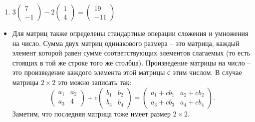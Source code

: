 \documentclass[11pt, a4paper]{extarticle}
\begin{document}
\begin{multicols}{2}
\begin{enumerate}[label=\alph*)]
		\item $3\begin{pmatrix}
		7 \\ -1
		\end{pmatrix} - 2 \begin{pmatrix}
		1 \\ 4
		\end{pmatrix} = \begin{pmatrix}
		19 \\ -11
		\end{pmatrix}$
	\end{enumerate}
\end{multicols}

\begin{itemize}
	\item Для матриц также определены стандартные операции сложения и умножения на число. Сумма двух матриц одинакового размера – это матрица, каждый элемент которой равен сумме соответствующих элементов слагаемых (то есть стоящих в той же строке того же столбца). Произведение матрицы на число – это произведение каждого элемента этой матрицы с этим числом. В случае матрицы $2\times 2$ это можно записать так:
	\[
	\begin{pmatrix}
	a_1 & a_2 \\ a_3 & 4
	\end{pmatrix} + c\begin{pmatrix}
	b_1 & b_2 \\ b_3 & b_4
	\end{pmatrix} = \begin{pmatrix}
	a_1 + cb_1 & a_2 + cb_2 \\ a_3 + cb_3 & a_4 + cb_4 
	\end{pmatrix}.
	\]
	Заметим, что последняя матрица тоже имеет размер $2 \times 2$.
\end{itemize}
\end{document}
